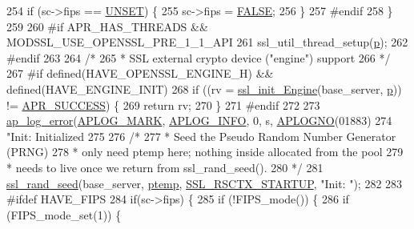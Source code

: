 \begin{DoxyCode}
{254         \textcolor{keywordflow}{if} (sc->fips == \hyperlink{mod__authz__core_8c_ab0b265b69299aeccfade9365cf04db2a}{UNSET}) \{
255             sc->fips = \hyperlink{group__MOD__SSL__PRIVATE_gaa93f0eb578d23995850d61f7d61c55c1}{FALSE};
256         \}
257 \textcolor{preprocessor}{#endif}
258     \}
259 
260 \textcolor{preprocessor}{#if APR\_HAS\_THREADS && MODSSL\_USE\_OPENSSL\_PRE\_1\_1\_API}
261     ssl\_util\_thread\_setup(\hyperlink{group__APACHE__CORE__MPM_ga5cd91701e5c167f2b1a38e70ab57817e}{p});
262 \textcolor{preprocessor}{#endif}
263 
264     \textcolor{comment}{/*}
265 \textcolor{comment}{     * SSL external crypto device ("engine") support}
266 \textcolor{comment}{     */}
267 \textcolor{preprocessor}{#if defined(HAVE\_OPENSSL\_ENGINE\_H) && defined(HAVE\_ENGINE\_INIT)}
268     \textcolor{keywordflow}{if} ((rv = \hyperlink{group__MOD__SSL__PRIVATE_gac18ba5fa4fd9e4dc94dc25a2e3823169}{ssl\_init\_Engine}(base\_server, \hyperlink{group__APACHE__CORE__MPM_ga5cd91701e5c167f2b1a38e70ab57817e}{p})) != \hyperlink{group__apr__errno_ga9ee311b7bf1c691dc521d721339ee2a6}{APR\_SUCCESS}) \{
269         \textcolor{keywordflow}{return} rv;
270     \}
271 \textcolor{preprocessor}{#endif}
272 
273     \hyperlink{group__APACHE__CORE__LOG_ga5e6676c87418af7a1d323a116c78ecb4}{ap\_log\_error}(\hyperlink{group__APACHE__CORE__LOG_ga655e126996849bcb82e4e5a14c616f4a}{APLOG\_MARK}, \hyperlink{group__APACHE__CORE__LOG_ga47fafbef7e478babdd92e90407f95b19}{APLOG\_INFO}, 0, s, 
      \hyperlink{group__APACHE__CORE__LOG_ga1dee8a07e06bc5b3de8b89662c2cd666}{APLOGNO}(01883)
274                  \textcolor{stringliteral}{"Init: Initialized %
275 
276     \textcolor{comment}{/*}
277 \textcolor{comment}{     * Seed the Pseudo Random Number Generator (PRNG)}
278 \textcolor{comment}{     * only need ptemp here; nothing inside allocated from the pool}
279 \textcolor{comment}{     * needs to live once we return from ssl\_rand\_seed().}
280 \textcolor{comment}{     */}
281     \hyperlink{group__MOD__SSL__PRIVATE_gaf0f8bd768edad2c6d116a824f0762b7f}{ssl\_rand\_seed}(base\_server, \hyperlink{group__AP__EXPR_gaab85d20515306c350c88fbc8f58673b7}{ptemp}, \hyperlink{group__MOD__SSL__PRIVATE_gga368ff85eb593119b57fd6f64fad13947a981c4628f08adb43a8937559cdab7ce5}{SSL\_RSCTX\_STARTUP}, \textcolor{stringliteral}{"Init: "});
282 
283 \textcolor{preprocessor}{#ifdef HAVE\_FIPS}
284     \textcolor{keywordflow}{if}(sc->fips) \{
285         \textcolor{keywordflow}{if} (!FIPS\_mode()) \{
286             \textcolor{keywordflow}{if} (FIPS\_mode\_set(1)) \{
}}
\end{DoxyCode}
